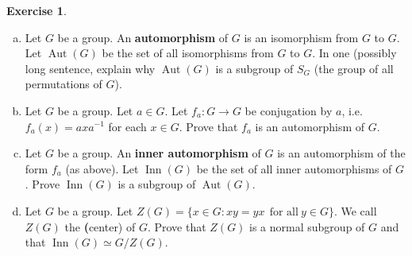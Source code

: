 \documentclass[11pt,oneside]{article}
\numberwithin{equation}{section}
\theoremstyle{definition}
\newtheorem{exercise}{Exercise}
\def\Aut{\operatorname{Aut}}
\def\Inn{\operatorname{Inn}}
\begin{document}
\begin{exercise}
  \begin{enumerate}[(a)]
  \item
    Let $G$ be a group.  An \textbf{automorphism} of $G$ is an
    isomorphism from $G$ to $G$. Let $\Aut(G)$ be the set of all
    isomorphisms from $G$ to $G$. In one (possibly long sentence,
    explain why $\Aut(G)$ is a subgroup of $S_G$ (the group of all permutations of $G$).
  \item
    Let $G$ be a group.  Let $a \in G$.  Let $f_a : G \to G$ be
    conjugation by $a$, i.e. $f_a(x) = a x a^ {-1}$ for each $x \in G$.
    Prove that $f_a$ is an automorphism of $G$.
  \item
    Let $G$ be a group.  An \textbf{inner automorphism} of $G$ is an
    automorphism of the form $f_a$ (as above). Let $\Inn(G) $ be the
    set of all inner automorphisms of $G$. Prove $\Inn(G)$ is a subgroup of
    $ \Aut(G)$.
  \item
    Let $G$ be a group. Let $Z(G) = \{ x \in G : xy = yx \ \ \text{for
      all} \ y \in G \}$.  We call $Z(G)$ the \textbf(center) of $G$.
    Prove that $Z(G)$ is a normal subgroup of $G$ and that $\Inn(G) \simeq G / Z(G)$.
  \end{enumerate}
\end{exercise}
\end{document}
